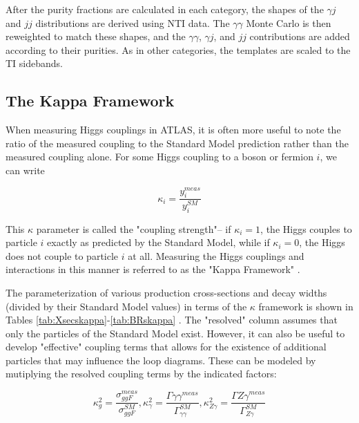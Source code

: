 After the purity fractions are calculated in each category, the shapes of the $\gamma j$ and $jj$ distributions are derived using NTI data. The $\gamma \gamma$ Monte Carlo is then reweighted to match these shapes, and the $\gamma \gamma$, $\gamma j$, and $jj$ contributions are added according to their purities. As in other categories, the templates are scaled to the TI sidebands. 

\subsection{The Kappa Framework} \label{sec:kappaFW}

When measuring Higgs couplings in ATLAS, it is often more useful to note the ratio of the measured coupling to the Standard Model prediction rather than the measured coupling alone. For some Higgs coupling to a boson or fermion $i$, we can write

\begin{equation}
\kappa_{i} = \frac{y_{i}^{meas}}{y_{i}^{SM}}
\end{equation}

This $\kappa$ parameter is called the "coupling strength"-- if $\kappa_{i} = 1$, the Higgs couples to particle $i$ exactly as predicted by the Standard Model, while if $\kappa_{i} = 0$, the Higgs does not couple to particle $i$ at all. Measuring the Higgs couplings and interactions in this manner is referred to as the "Kappa Framework" \cite{LHCHiggsCrossSectionWorkingGroup}.

The parameterization of various production cross-sections and decay widths (divided by their Standard Model values) in terms of the $\kappa$ framework is shown in Tables \ref{tab:Xsecskappa}-\ref{tab:BRskappa} \cite{PhysRevD.101.012002}. The "resolved" column assumes that only the particles of the Standard Model exist. However, it can also be useful to develop "effective" coupling terms that allows for the existence of additional particles that may influence the loop diagrams. These can be modeled by mutiplying the resolved coupling terms by the indicated factors:

\begin{equation}
\kappa_{g}^{2} = \frac{\sigma_{ggF}^{meas}}{\sigma_{ggF}^{SM}}, \kappa_{\gamma}^{2} = \frac{\Gamma{\gamma \gamma}^{meas}}{\Gamma_{\gamma \gamma}^{SM}}, \kappa_{Z \gamma}^{2} = \frac{\Gamma{Z \gamma}^{meas}}{\Gamma_{Z \gamma}^{SM}}
\end{equation}

